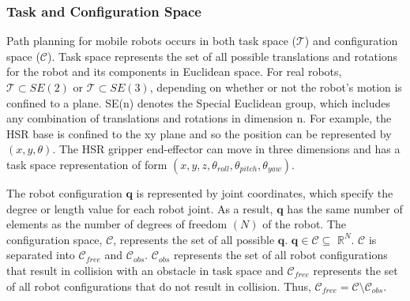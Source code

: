 \documentclass[12pt]{article}
\begin{document}
        \subsubsection{Task and Configuration Space}
            Path planning for mobile robots occurs in both task space ($\mathcal{T}$) and configuration space ($\mathcal{C}$). Task space represents the set of all possible translations and rotations for the robot and its components in Euclidean space. For real robots, $\mathcal{T}\subset SE(2)$ or $\mathcal{T}\subset SE(3)$, depending on whether or not the robot's motion is confined to a plane. SE(n) denotes the Special Euclidean group, which includes any combination of translations and rotations in dimension n. For example, the HSR base is confined to the xy plane and so the position can be represented by $(x,y, \theta)$. The HSR gripper end-effector can move in three dimensions and has a task space representation of form $(x,y,z,\theta_{roll}, \theta_{pitch}, \theta_{yaw})$.
            \par The robot configuration $\mathbf{q}$ is represented by joint coordinates, which specify the degree or length value for each robot joint. As a result, $\mathbf{q}$ has the same number of elements as the number of degrees of freedom $(N)$ of the robot. The configuration space, $\mathcal{C}$, represents the set of all possible $\mathbf{q}$. $\mathbf{q} \in \mathcal{C} \subseteq$ $\mathbb{R}^{N}$. $\mathcal{C}$ is separated into $\mathcal{C}_{free}$ and $\mathcal{C}_{obs}$. $\mathcal{C}_{obs}$ represents the set of all robot configurations that result in collision with an obstacle in task space and $\mathcal{C}_{free}$ represents the set of all robot configurations that do not result in collision. Thus, $\mathcal{C}_{free} = \mathcal{C} \setminus \mathcal{C}_{obs}$.\cite{lavalle_planning_2006}
\end{document}
